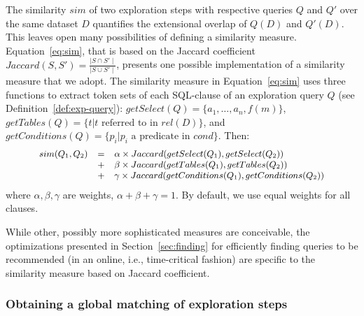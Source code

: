 The similarity $sim$ of two exploration steps with respective queries $Q$ and $Q'$ over the same dataset $D$ quantifies the extensional overlap of $Q(D)$ and $Q'(D)$. This leaves open many possibilities of defining a similarity measure. 
Equation~\ref{eq:sim}, that is based on the Jaccard coefficient $Jaccard(S, S') = \frac{\mid S \cap S' \mid}{\mid S \cup S' \mid}$, presents one possible implementation of a similarity measure that we adopt. 
The similarity measure in Equation~\ref{eq:sim} uses three functions to extract token sets of each SQL-clause of an exploration query $Q$ (see Definition~\ref{def:exp-query}): $getSelect(Q) = \{a_1, \ldots, a_n, f(m)\}$,\\ $getTables(Q) = \{t | t \text{ referred to in } rel(D)\}$, and\\ $getConditions(Q) = \{p_i | p_i \text{ a predicate in } cond\}$. Then:
\begin{equation}
 \small\addtolength{\tabcolsep}{-6pt}
\begin{array}{lcl}
sim(Q_1,Q_2)  & = &   \alpha \times Jaccard(getSelect(Q_1), getSelect(Q_2)) \\
 &+  &  \beta \times Jaccard(getTables(Q_1), getTables(Q_2)) \\
 &+ &  \gamma \times Jaccard(getConditions(Q_1), getConditions(Q_2))
\end{array}
\label{eq:sim}
\end{equation}
\noindent where $\alpha, \beta, \gamma$ are weights, $\alpha + \beta + \gamma = 1$. By default, we use equal weights for all clauses.


While other, possibly more sophisticated measures are conceivable, the optimizations presented in Section~\ref{sec:finding} for efficiently finding queries to be recommended (in an online, i.e., time-critical fashion) %
are specific to the similarity measure based on Jaccard coefficient.
 
 
    
  
  \subsubsection{Obtaining a global matching of exploration steps}
  \label{sec:fuse-cycles}



